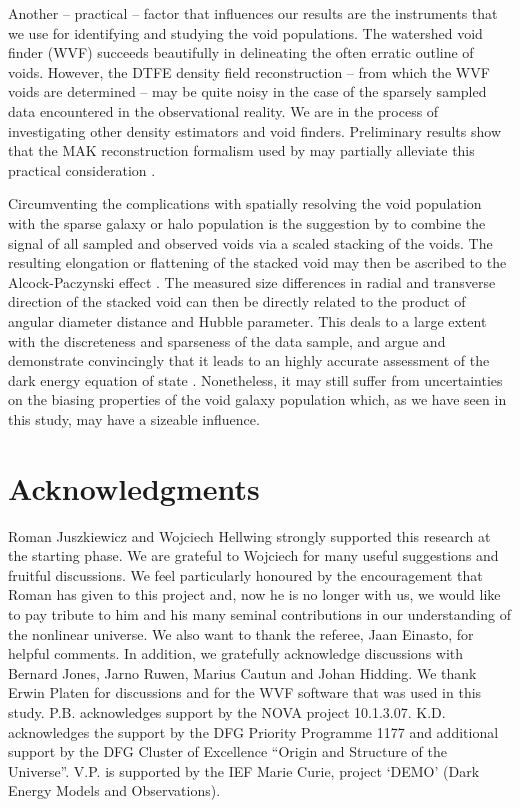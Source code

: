 Another -- practical -- factor that influences our results are the instruments that we use for identifying and studying the 
void populations. The watershed void finder (WVF) succeeds beautifully in delineating the often erratic outline of voids. 
However, the DTFE density field reconstruction -- from which the WVF voids are determined -- may be quite noisy in the case 
of the sparsely sampled data encountered in the observational reality. We are in the process of investigating other 
density estimators and void finders. Preliminary results show that the MAK reconstruction formalism used by 
\citet{lavaux10} may partially alleviate this practical consideration \citep{ruwen11}.

Circumventing the complications with spatially resolving the void population with the sparse galaxy or halo 
population is the suggestion by \cite{lavaux11} to combine the signal of all sampled and observed voids via 
a scaled stacking of the voids. The resulting elongation or flattening of the stacked void may then be 
ascribed to the Alcock-Paczynski effect \citep{alcock79}. The measured size differences in radial and 
transverse direction of the stacked void can then be directly related to the product of angular diameter 
distance and Hubble parameter. This deals to a large extent with the discreteness and sparseness of the  
data sample, and \cite{lavaux11} argue and demonstrate convincingly that it leads to an highly accurate 
assessment of the dark energy equation of state \citep[also see][]{shoji12}. Nonetheless, it may still suffer 
from uncertainties on the biasing properties of the void galaxy population which, as we have seen in this 
study, may have a sizeable influence.


\section*{Acknowledgments}
\label{sec:acknowledgements}
Roman Juszkiewicz and Wojciech Hellwing strongly supported this research at the starting phase. We are grateful 
to Wojciech for many useful suggestions and fruitful discussions. We feel particularly honoured by the 
encouragement that Roman has given to this project and, now he is no longer with us, we would like to pay tribute 
to him and his many seminal contributions in our understanding of the nonlinear universe.
We also want to thank the referee, Jaan Einasto, for helpful comments. In addition, we gratefully 
acknowledge discussions with Bernard Jones, Jarno Ruwen, Marius Cautun and Johan Hidding. We thank Erwin Platen for 
discussions and for the WVF software that was used in this study. P.B. acknowledges support by the NOVA project 
10.1.3.07. K.D. acknowledges the support by the DFG Priority Programme 1177 and additional support by the 
DFG Cluster of Excellence ``Origin and Structure of the Universe''. V.P. is supported by 
the IEF Marie Curie, project `DEMO' (Dark Energy Models and Observations).









\begin{subappendices}

\end{subappendices}
